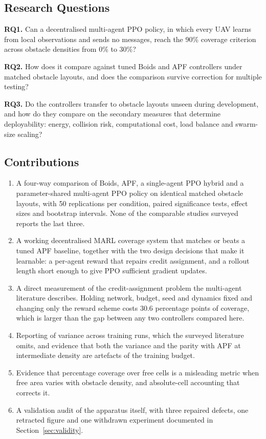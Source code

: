 \documentclass[a4paper, 10pt, conference]{ieeeconf}
\begin{document}
\subsection{Research Questions}

\textbf{RQ1.} Can a decentralised multi-agent PPO policy, in
which every UAV learns from local observations and sends no messages,
reach the 90\% coverage criterion across obstacle densities from 0\%
to 30\%?

\textbf{RQ2.} How does it compare against tuned Boids and APF
controllers under matched obstacle layouts, and does the comparison
survive correction for multiple testing?

\textbf{RQ3.} Do the controllers transfer to obstacle layouts unseen
during development, and how do they compare on the secondary measures
that determine deployability: energy, collision risk, computational
cost, load balance and swarm-size scaling?

\subsection{Contributions}

\begin{enumerate}
    \item A four-way comparison of Boids, APF, a single-agent PPO
    hybrid and a parameter-shared multi-agent PPO policy on identical
    matched obstacle layouts, with 50 replications per condition,
    paired significance tests, effect sizes and bootstrap intervals.
    None of the comparable studies surveyed reports the last three.
    \item A working decentralised MARL coverage system that
    matches or beats a tuned APF baseline, together with the two
    design decisions that make it learnable: a per-agent reward that
    repairs credit assignment, and a rollout length short enough to
    give PPO sufficient gradient updates.
    \item A direct measurement of the credit-assignment problem the
    multi-agent literature describes. Holding network, budget, seed
    and dynamics fixed and changing only the reward scheme costs 30.6
    percentage points of coverage, which is larger than the gap
    between any two controllers compared here.
    \item Reporting of variance across training runs, which the
    surveyed literature omits, and evidence that both the variance and
    the parity with APF at intermediate density are artefacts of the
    training budget.
    \item Evidence that percentage coverage over free cells is a
    misleading metric when free area varies with obstacle density, and
    absolute-cell accounting that corrects it.
    \item A validation audit of the apparatus itself, with three
    repaired defects, one retracted figure and one withdrawn
    experiment documented in Section~\ref{sec:validity}.
\end{enumerate}
\end{document}
